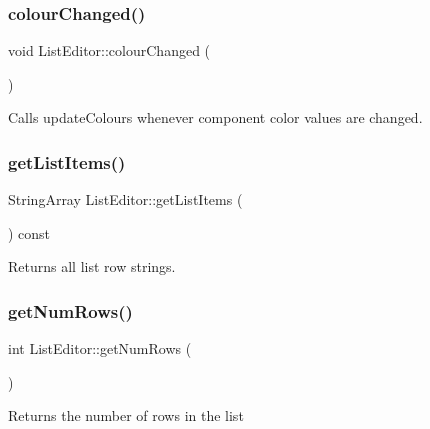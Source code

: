 \subsubsection{\texorpdfstring{colour\+Changed()}{colourChanged()}}
{\footnotesize\ttfamily void List\+Editor\+::colour\+Changed (\begin{DoxyParamCaption}{ }\end{DoxyParamCaption})\hspace{0.3cm}{\ttfamily [override]}}

Calls update\+Colours whenever component color values are changed. \mbox{\label{classListEditor_a4ac52086c134de41552e98ba1c425e51}} 
\subsubsection{\texorpdfstring{get\+List\+Items()}{getListItems()}}
{\footnotesize\ttfamily String\+Array List\+Editor\+::get\+List\+Items (\begin{DoxyParamCaption}{ }\end{DoxyParamCaption}) const}

\begin{DoxyReturn}{Returns}
all list row strings. 
\end{DoxyReturn}
\mbox{\label{classListEditor_a6c6a99c9a44c0ae3917cfd99cf55fde9}} 
\subsubsection{\texorpdfstring{get\+Num\+Rows()}{getNumRows()}}
{\footnotesize\ttfamily int List\+Editor\+::get\+Num\+Rows (\begin{DoxyParamCaption}{ }\end{DoxyParamCaption})}

\begin{DoxyReturn}{Returns}
the number of rows in the list 
\end{DoxyReturn}
\mbox{\label{classListEditor_aea184ebf953b388ad7a9565a2a383237}} 
